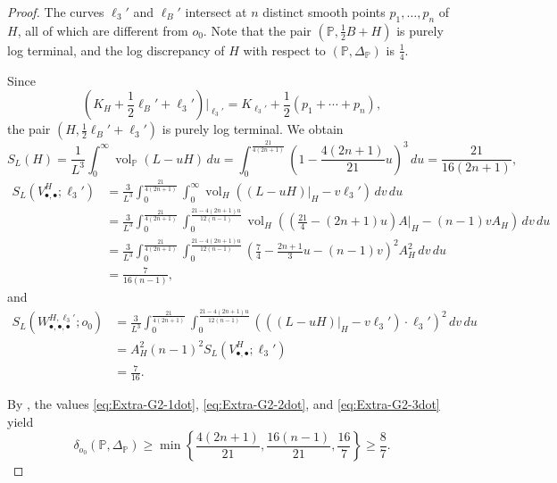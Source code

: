 \documentclass[12pt]{amsart}
\theoremstyle{definition}
\theoremstyle{remark}
\begin{document}
\begin{proof}
The curves $\ell_3'$ and $\ell_B'$ intersect at $n$ distinct smooth points
$
p_1,\ldots,p_n
$
of $H$, all of which are different from $o_0$. Note that the pair $(\mathbb{P},\frac{1}{2}B+H)$ is purely log terminal, and the log discrepancy of $H$ with respect to $(\mathbb{P},\Delta_\mathbb{P})$ is $\frac{1}{4}$.

Since
\[
\left(K_H+\frac{1}{2}\ell_B'+\ell_3'\right)\Big|_{\ell_3'}
=
K_{\ell_3'}+\frac{1}{2}\left(p_1+\cdots+p_n\right),
\]
the pair $(H,\frac{1}{2}\ell_B'+\ell_3')$ is purely log terminal. We obtain
\begin{equation}\label{eq:Extra-G2-1dot}
S_L(H)
=
\frac{1}{L^3}\int_0^\infty
\operatorname{vol}_{\mathbb P}(L-uH)\,du
=
\int_0^{\frac{21}{4(2n+1)}}
\left(1-\frac{4(2n+1)}{21}u\right)^3\,du
=
\frac{21}{16(2n+1)},
\end{equation}
\begin{equation}\label{eq:Extra-G2-2dot}
\begin{split}
S_L(V_{\bullet,\bullet}^{H};\ell_3')
&=
\frac{3}{L^3}
\int_0^{\frac{21}{4(2n+1)}}
\int_0^\infty
\operatorname{vol}_{H}
\left(\left.(L-uH)\right|_H-v\ell_3'\right)\,dv\,du\\
&=
\frac{3}{L^3}
\int_0^{\frac{21}{4(2n+1)}}
\int_0^{\frac{21-4(2n+1)u}{12(n-1)}}
\operatorname{vol}_{H}
\left(
\left(\frac{21}{4}-(2n+1)u\right)A|_H-(n-1)vA_H
\right)\,dv\,du\\
&=
\frac{3}{L^3}
\int_0^{\frac{21}{4(2n+1)}}
\int_0^{\frac{21-4(2n+1)u}{12(n-1)}}
\left(
\frac{7}{4}-\frac{2n+1}{3}u-(n-1)v
\right)^2 A_H^2\,dv\,du\\
&=
\frac{7}{16(n-1)},
\end{split}
\end{equation}
and 
\begin{equation}\label{eq:Extra-G2-3dot}
\begin{split}
S_L(W_{\bullet,\bullet,\bullet}^{H,\ell_3'};o_0)
&=
\frac{3}{L^3}
\int_0^{\frac{21}{4(2n+1)}}
\int_0^{\frac{21-4(2n+1)u}{12(n-1)}}
\left(
\left(
\left.(L-uH)\right|_H-v\ell_3'
\right)\cdot\ell_3'
\right)^2\,dv\,du\\
&=
A_H^2(n-1)^2
S_L(V_{\bullet,\bullet}^{H};\ell_3')\\
&=
\frac{7}{16}.
\end{split}
\end{equation}

By \cite[Corollary~4.8]{Fu23}, the values \eqref{eq:Extra-G2-1dot}, \eqref{eq:Extra-G2-2dot}, and \eqref{eq:Extra-G2-3dot} yield
\[
\delta_{o_0}(\mathbb{P},\Delta_\mathbb{P})
\geq
\min\left\{
\frac{4(2n+1)}{21},
\frac{16(n-1)}{21},
\frac{16}{7}
\right\}
\geq\frac{8}{7}.
\]



\end{proof}
\end{document}
